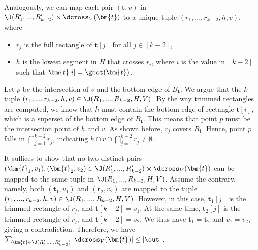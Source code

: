 \vgap 

Analogously, we can map each pair $(\bm{t},v)$ in $\J(R_1',...,R_{k-2}')\times \dcross_V(\bm{t})$ to a unique tuple $(r_1,...,r_{k-2},h,v)$, where 
\begin{itemize}
    \item $r_j$ is the full rectangle of $\bm{t}[j]$ for all $j \in [k-2]$,
    \item $h$ is the lowest segment in $H$ that crosses $r_i$, where $i$ is the value in $[k-2]$ such that $\bm{t}[i] = \gbot(\bm{t})$.
\end{itemize}
Let $p$ be the intersection of $v$ and the bottom edge of $B_\bm{t}$. We argue that the $k$-tuple $(r_1, ..., r_{k-2}, h, v)\in \J(R_1,..., R_{k-2},H,V)$. By the way trimmed rectangles are computed, we know that $h$ must contain the bottom edge of rectangle $\bm{t}[i]$, which is a superset of the bottom edge of $B_\bm{t}$. This means that point $p$ must be the intersection point of $h$ and $v$. As shown before, $r_j$ covers $B_\bm{t}$. Hence, point $p$ falls in $\bigcap_{j=1}^{k-2} r_j$, indicating $h \cap v \cap \bigcap_{j=1}^{k-2} r_j \ne \emptyset$. 

\vgap 

It suffices to show that no two distinct pairs $(\bm{t}_1, v_1), (\bm{t}_2, v_2) \in \J(R_1',...,R_{k-2}')\times \dcross_V(\bm{t})$ can be mapped to the same tuple in $\J(R_1,..., R_{k-2},H,V)$. Assume the contrary, namely, both $(\bm{t}_1, v_1)$ and $(\bm{t}_2, v_2)$ are mapped to the tuple $(r_1, ..., r_{k-2}, h, v) \in \J(R_1,..., R_{k-2}, H, V)$. However, in this case, $\bm{t}_1[j]$ is the trimmed rectangle of $r_j$, and $\bm{t}[k-2] = v_1$. At the same time, $\bm{t}_2[j]$ is the trimmed rectangle of $r_j$, and $\bm{t}[k-2] = v_2$. We thus have $\bm{t}_1 = \bm{t}_2$ and $v_1 = v_2$, giving a contradiction.
Therefore, we have $\sum_{\bm{t}\in \J(R_1',...,R_{k-2}')}  |\dcross_V(\bm{t})| \leq |\out|$.

